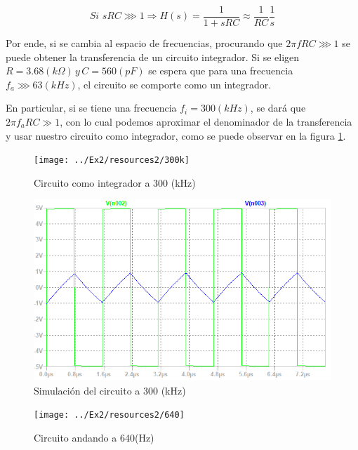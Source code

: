 \[
Si\,\,sRC\ggg1\Longrightarrow H(s)=\frac{1}{1+sRC}\approx\frac{1}{RC}\frac{1}{s}
\]

Por ende, si se cambia al espacio de frecuencias, procurando que $2\pi fRC\ggg1$
se puede obtener la transferencia de un circuito integrador. Si se eligen $R=3.68(k\Omega)\,y\,C=560(pF)$ se espera que para una
frecuencia $f_{a}\ggg63(kHz)$, el circuito se comporte como
un integrador.

En particular, si se tiene una frecuencia $f_{i}=300(kHz)$, se dará que $2\pi f_{a}RC\gg1$, con
lo cual podemos aproximar el denominador de la transferencia y usar
nuestro circuito como integrador, como se puede observar en la figura
\ref{2_6}.

\begin{figure}[H]
\begin{centering}
\texttt{[image: ../Ex2/resources2/300k]} 
\par\end{centering}
\caption{Circuito como integrador a 300 (kHz)}
\label{2_6}
\end{figure}

\begin{figure}[H]
\begin{centering}
\includegraphics[scale=0.6]{../Ex2/resources2/sim} 
\par\end{centering}
\caption{Simulación del circuito a 300 (kHz)}
\end{figure}

\begin{figure}[H]
\begin{centering}
\texttt{[image: ../Ex2/resources2/640]} 
\par\end{centering}
\caption{Circuito andando a 640(Hz)}
\end{figure}
